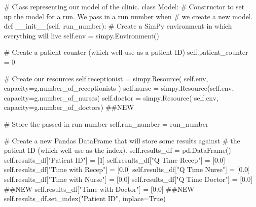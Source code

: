 \documentclass[
  letterpaper,
  DIV=11,
  numbers=noendperiod]{scrreprt}
\newenvironment{Shaded}{\begin{snugshade}}{\end{snugshade}}
\newcommand{\CommentTok}[1]{\textcolor[rgb]{0.37,0.37,0.37}{#1}}
\newcommand{\DecValTok}[1]{\textcolor[rgb]{0.68,0.00,0.00}{#1}}
\newcommand{\FloatTok}[1]{\textcolor[rgb]{0.68,0.00,0.00}{#1}}
\newcommand{\FunctionTok}[1]{\textcolor[rgb]{0.28,0.35,0.67}{#1}}
\newcommand{\KeywordTok}[1]{\textcolor[rgb]{0.00,0.23,0.31}{#1}}
\newcommand{\NormalTok}[1]{\textcolor[rgb]{0.00,0.23,0.31}{#1}}
\newcommand{\OperatorTok}[1]{\textcolor[rgb]{0.37,0.37,0.37}{#1}}
\newcommand{\StringTok}[1]{\textcolor[rgb]{0.13,0.47,0.30}{#1}}
\newcommand{\VariableTok}[1]{\textcolor[rgb]{0.07,0.07,0.07}{#1}}
\begin{document}
\begin{Shaded}
\begin{Highlighting}[]
\CommentTok{\# Class representing our model of the clinic.}
\KeywordTok{class}\NormalTok{ Model:}
    \CommentTok{\# Constructor to set up the model for a run.  We pass in a run number when}
    \CommentTok{\# we create a new model.}
    \KeywordTok{def} \FunctionTok{\_\_init\_\_}\NormalTok{(}\VariableTok{self}\NormalTok{, run\_number):}
        \CommentTok{\# Create a SimPy environment in which everything will live}
        \VariableTok{self}\NormalTok{.env }\OperatorTok{=}\NormalTok{ simpy.Environment()}

        \CommentTok{\# Create a patient counter (which we\textquotesingle{}ll use as a patient ID)}
        \VariableTok{self}\NormalTok{.patient\_counter }\OperatorTok{=} \DecValTok{0}

        \CommentTok{\# Create our resources}
        \VariableTok{self}\NormalTok{.receptionist }\OperatorTok{=}\NormalTok{ simpy.Resource(}
            \VariableTok{self}\NormalTok{.env, capacity}\OperatorTok{=}\NormalTok{g.number\_of\_receptionists}
\NormalTok{        )}
        \VariableTok{self}\NormalTok{.nurse }\OperatorTok{=}\NormalTok{ simpy.Resource(}\VariableTok{self}\NormalTok{.env, capacity}\OperatorTok{=}\NormalTok{g.number\_of\_nurses)}
        \VariableTok{self}\NormalTok{.doctor }\OperatorTok{=}\NormalTok{ simpy.Resource(}
            \VariableTok{self}\NormalTok{.env, capacity}\OperatorTok{=}\NormalTok{g.number\_of\_doctors) }\CommentTok{\#\#NEW}

        \CommentTok{\# Store the passed in run number}
        \VariableTok{self}\NormalTok{.run\_number }\OperatorTok{=}\NormalTok{ run\_number}

        \CommentTok{\# Create a new Pandas DataFrame that will store some results against}
        \CommentTok{\# the patient ID (which we\textquotesingle{}ll use as the index).}
        \VariableTok{self}\NormalTok{.results\_df }\OperatorTok{=}\NormalTok{ pd.DataFrame()}
        \VariableTok{self}\NormalTok{.results\_df[}\StringTok{"Patient ID"}\NormalTok{] }\OperatorTok{=}\NormalTok{ [}\DecValTok{1}\NormalTok{]}
        \VariableTok{self}\NormalTok{.results\_df[}\StringTok{"Q Time Recep"}\NormalTok{] }\OperatorTok{=}\NormalTok{ [}\FloatTok{0.0}\NormalTok{]}
        \VariableTok{self}\NormalTok{.results\_df[}\StringTok{"Time with Recep"}\NormalTok{] }\OperatorTok{=}\NormalTok{ [}\FloatTok{0.0}\NormalTok{]}
        \VariableTok{self}\NormalTok{.results\_df[}\StringTok{"Q Time Nurse"}\NormalTok{] }\OperatorTok{=}\NormalTok{ [}\FloatTok{0.0}\NormalTok{]}
        \VariableTok{self}\NormalTok{.results\_df[}\StringTok{"Time with Nurse"}\NormalTok{] }\OperatorTok{=}\NormalTok{ [}\FloatTok{0.0}\NormalTok{]}
        \VariableTok{self}\NormalTok{.results\_df[}\StringTok{"Q Time Doctor"}\NormalTok{] }\OperatorTok{=}\NormalTok{ [}\FloatTok{0.0}\NormalTok{] }\CommentTok{\#\#NEW}
        \VariableTok{self}\NormalTok{.results\_df[}\StringTok{"Time with Doctor"}\NormalTok{] }\OperatorTok{=}\NormalTok{ [}\FloatTok{0.0}\NormalTok{] }\CommentTok{\#\#NEW}
        \VariableTok{self}\NormalTok{.results\_df.set\_index(}\StringTok{"Patient ID"}\NormalTok{, inplace}\OperatorTok{=}\VariableTok{True}\NormalTok{)}


\end{Highlighting}
\end{Shaded}
\end{document}
